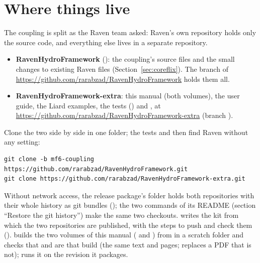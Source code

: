\section{Where things live}
The coupling is split as the Raven team asked: Raven's own repository holds only the source code, and everything else
lives in a separate repository.
\begin{itemize}
\item \textbf{RavenHydroFramework} (): the coupling's source files and the small changes to existing Raven files
      (Section~\ref{sec:coreflix}). The branch  of
      \url{https://github.com/rarabzad/RavenHydroFramework} holds them all.
\item \textbf{RavenHydroFramework-extra}: this manual (both volumes), the user guide, the Liard examples, the tests
      () and , at\\ \url{https://github.com/rarabzad/RavenHydroFramework-extra}
      (branch ).
\end{itemize}
Clone the two side by side in one folder; the tests and  then find Raven without any setting:
\begin{lstlisting}
git clone -b mf6-coupling https://github.com/rarabzad/RavenHydroFramework.git
git clone https://github.com/rarabzad/RavenHydroFramework-extra.git
\end{lstlisting}
Without network access, the release package's  folder holds both repositories with their whole history as
git bundles (); the two  commands of its README (section ``Restore the git
history'') make the same two checkouts.  writes the kit from which the two repositories are
published, with the steps to push and check them ().  builds the two
volumes of this manual ( and ) from  in a scratch folder and checks
that  and  are that build (the same
text and pages;  replaces a PDF that is not);  runs it on the revision it packages.

